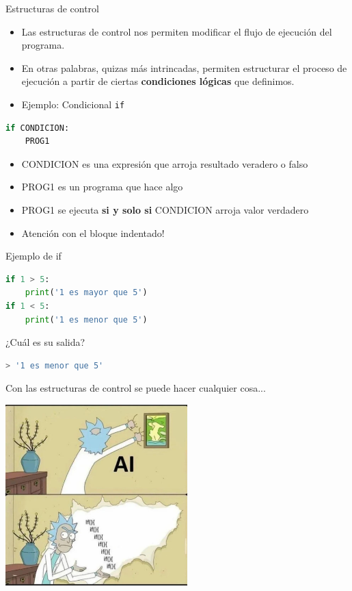 \documentclass{beamer}
\begin{document}
\begin{frame}[fragile]{Estructuras de control} \pause
\begin{itemize}
    \item Las estructuras de control nos permiten  modificar el flujo de ejecución del programa. \pause
    \item En otras palabras, quizas más intrincadas, permiten estructurar el proceso de ejecución a partir de ciertas \textbf{condiciones lógicas} que definimos. \pause
    \item Ejemplo: Condicional \texttt{if} \pause
\end{itemize}

\begin{lstlisting}[language=Python]
if CONDICION:
    PROG1 
\end{lstlisting} \pause

\begin{itemize}
    \item CONDICION es una expresión que arroja resultado veradero o falso
    \item PROG1 es un programa que hace algo
    \item PROG1 se ejecuta \textbf{si y solo si} CONDICION arroja valor verdadero \pause
    \item Atención con el bloque indentado!
\end{itemize}
\end{frame}

\begin{frame}[fragile]{Ejemplo de if}
\begin{lstlisting}[language=Python]
if 1 > 5:
    print('1 es mayor que 5')
if 1 < 5:
    print('1 es menor que 5') 
\end{lstlisting} \pause

¿Cuál es su salida? \pause
\begin{lstlisting}[language=Python]
> '1 es menor que 5'
\end{lstlisting}
\end{frame}

\begin{frame}{Con las estructuras de control se puede hacer cualquier cosa...} \pause
\begin{center}
\includegraphics[height=7cm, scale=0.5]{recursos/rick_ai.jpeg}
\end{center}
\end{frame}
\end{document}
